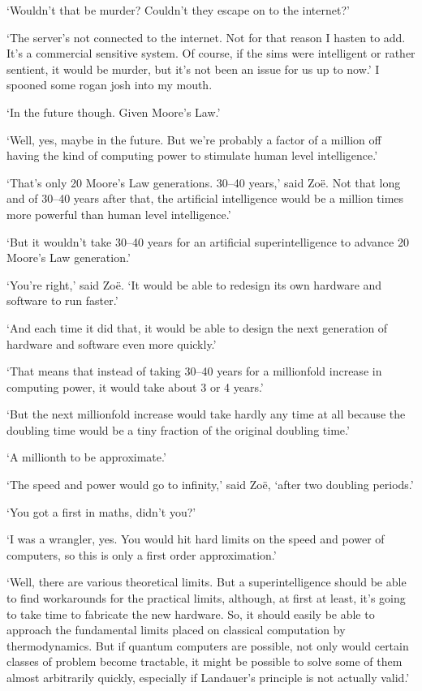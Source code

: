 `Wouldn't that be murder? Couldn't they escape on to the
internet?'

`The server's not connected to the internet. Not for that reason I
hasten to add. It's a commercial sensitive system. Of course, if the
sims were intelligent or rather sentient, it would be murder, but
it's not been an issue for us up to now.' I spooned some rogan josh
into my mouth.

`In the future though. Given Moore's Law.'

`Well, yes, maybe in the future. But we're probably a factor of a
million off having the kind of computing power to stimulate human
level intelligence.'

`That's only 20 Moore's Law generations.
30--40 years,' said Zo{\"e}. Not that long and of 30--40 years
after that, the artificial intelligence would be a million times
more powerful than human level intelligence.'

`But it wouldn't take 30--40 years for an artificial
superintelligence to advance 20 Moore's Law generation.'

`You're right,' said Zo{\"e}. `It would be able to redesign its
own hardware and software to run faster.'

`And each time it did that, it would be able to design the next
generation of hardware and software even more quickly.'

`That means that instead of taking 30--40 years for a millionfold increase in
computing power, it would take about 3 or 4 years.'

`But the next millionfold increase would take hardly any time at all
because the doubling time would be a tiny fraction of the original
doubling time.'

`A millionth to be approximate.'

`The speed and power would go to infinity,' said Zo{\"e},
`after two doubling periods.'

`You got a first in maths, didn't you?'

`I was a wrangler, yes. You would hit hard limits on the
speed and power of computers, so this is only a first order approximation.'

`Well, there are various theoretical limits. But a superintelligence
should be able to find workarounds for the practical limits,
although, at first at least, it's going to take time to fabricate
the new hardware. So, it should easily be able to approach the
fundamental limits placed on classical computation by
thermodynamics. But if quantum computers are possible, not only
would certain classes of problem become tractable, it might be
possible to solve some of them almost arbitrarily quickly, especially if Landauer's principle is not actually valid.'

